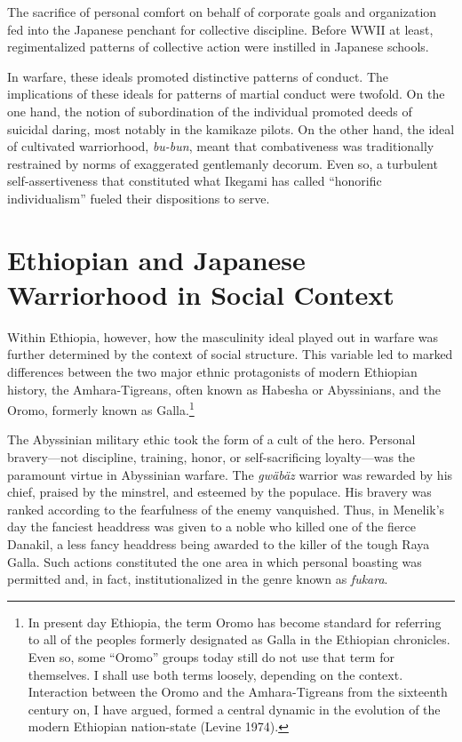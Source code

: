 The sacrifice of personal comfort on behalf of corporate goals and organization fed into the Japanese penchant for collective discipline. Before WWII at least, regimentalized patterns of collective action were instilled in Japanese schools. 

In warfare, these ideals promoted distinctive patterns of conduct. The implications of these ideals for patterns of martial conduct were twofold. On the one hand, the notion of subordination of the individual promoted deeds of suicidal daring, most notably in the kamikaze pilots. On the other hand, the ideal of cultivated warriorhood, \emph{bu-bun}, meant that combativeness was traditionally restrained by norms of exaggerated gentlemanly decorum. Even so, a turbulent self-assertiveness that constituted what Ikegami has called ``honorific individualism'' fueled their dispositions to serve.

\section*{Ethiopian and Japanese Warriorhood in Social Context}

Within Ethiopia, however, how the masculinity ideal played out in warfare was further determined by the context of social structure. This variable led to marked differences between the two major ethnic protagonists of modern Ethiopian history, the Amhara-Tigreans, often known as Habesha or Abyssinians, and the Oromo, formerly known as Galla.\footnote{In present day Ethiopia, the term Oromo has become standard for referring to all of the peoples formerly designated as Galla in the Ethiopian chronicles.  Even so, some ``Oromo'' groups today still do not use that term for themselves.  I shall use both terms loosely, depending on the context.  Interaction between the Oromo and the Amhara-Tigreans from the sixteenth century on, I have argued, formed a central dynamic in the evolution of the modern Ethiopian nation-state (Levine 1974).}

The Abyssinian military ethic took the form of a cult of the hero. Personal bravery---not discipline, training, honor, or self-sacrificing loyalty---was the paramount virtue in Abyssinian warfare. The \emph{gw\"{a}b\"{a}z} warrior was rewarded by his chief, praised by the minstrel, and esteemed by the populace. His bravery was ranked according to the fearfulness of the enemy vanquished. Thus, in Menelik's day the fanciest headdress was given to a noble who killed one of the fierce Danakil, a less fancy headdress being awarded to the killer of the tough Raya Galla. Such actions constituted the one area in which personal boasting was permitted and, in fact, institutionalized in the genre known as \emph{fukara}. 

